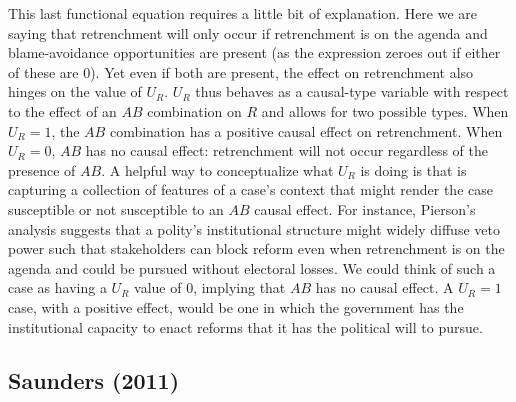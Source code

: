 \documentclass[12pt,]{book}
\begin{document}
This last functional equation requires a little bit of explanation. Here we are saying that retrenchment will only occur if retrenchment is on the agenda and blame-avoidance opportunities are present (as the expression zeroes out if either of these are 0). Yet even if both are present, the effect on retrenchment also hinges on the value of \(U_R\). \(U_R\) thus behaves as a causal-type variable with respect to the effect of an \(AB\) combination on \(R\) and allows for two possible types. When \(U_R=1\), the \(AB\) combination has a positive causal effect on retrenchment. When \(U_R=0\), \(AB\) has no causal effect: retrenchment will not occur regardless of the presence of \(AB\). A helpful way to conceptualize what \(U_R\) is doing is that is capturing a collection of features of a case's context that might render the case susceptible or not susceptible to an \(AB\) causal effect. For instance, Pierson's analysis suggests that a polity's institutional structure might widely diffuse veto power such that stakeholders can block reform even when retrenchment is on the agenda and could be pursued without electoral losses. We could think of such a case as having a \(U_R\) value of 0, implying that \(AB\) has no causal effect. A \(U_R=1\) case, with a positive effect, would be one in which the government has the institutional capacity to enact reforms that it has the political will to pursue.

\hypertarget{saunders-2011}{%
\subsection{Saunders (2011)}\label{saunders-2011}}
\end{document}
